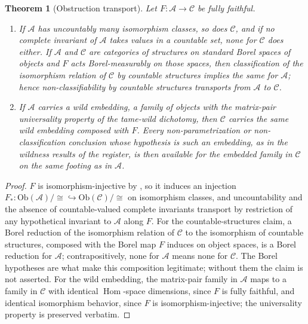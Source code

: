 \documentclass[11pt,letterpaper]{article}
\newtheorem{theorem}{Theorem}[section]
\theoremstyle{definition}
\theoremstyle{remark}
\begin{document}
\begin{theorem}[Obstruction transport]
\label{thm:transport}
Let $F: \mathcal{A} \to \mathcal{C}$ be fully faithful.
\begin{enumerate}
\item If $\mathcal{A}$ has uncountably many isomorphism classes, so does $\mathcal{C}$, and if no complete invariant of $\mathcal{A}$ takes values in a countable set, none for $\mathcal{C}$ does either. If $\mathcal{A}$ and $\mathcal{C}$ are categories of structures on standard Borel spaces of objects and $F$ acts Borel-measurably on those spaces, then classification of the isomorphism relation of $\mathcal{C}$ by countable structures implies the same for $\mathcal{A}$; hence non-classifiability by countable structures transports from $\mathcal{A}$ to $\mathcal{C}$.
\item If $\mathcal{A}$ carries a wild embedding, a family of objects with the matrix-pair universality property of the tame-wild dichotomy, then $\mathcal{C}$ carries the same wild embedding composed with $F$. Every non-parametrization or non-classification conclusion whose hypothesis is such an embedding, as in the wildness results of the register, is then available for the embedded family in $\mathcal{C}$ on the same footing as in $\mathcal{A}$.
\end{enumerate}
\end{theorem}

\begin{proof}
$F$ is isomorphism-injective by , so it induces an injection $F_*: \mathrm{Ob}(\mathcal{A})/{\cong} \hookrightarrow \mathrm{Ob}(\mathcal{C})/{\cong}$ on isomorphism classes, and uncountability and the absence of countable-valued complete invariants transport by restriction of any hypothetical invariant to $\mathcal{A}$ along $F$. For the countable-structures claim, a Borel reduction of the isomorphism relation of $\mathcal{C}$ to the isomorphism of countable structures, composed with the Borel map $F$ induces on object spaces, is a Borel reduction for $\mathcal{A}$; contrapositively, none for $\mathcal{A}$ means none for $\mathcal{C}$. The Borel hypotheses are what make this composition legitimate; without them the claim is not asserted. For the wild embedding, the matrix-pair family in $\mathcal{A}$ maps to a family in $\mathcal{C}$ with identical $\operatorname{Hom}$-space dimensions, since $F$ is fully faithful, and identical isomorphism behavior, since $F$ is isomorphism-injective; the universality property is preserved verbatim.
\end{proof}
\end{document}
